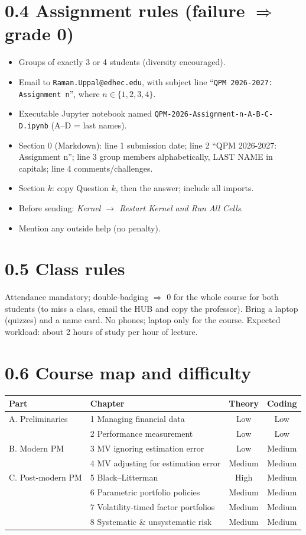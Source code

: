 \documentclass[11pt,a4paper]{report}
\begin{document}
\section*{0.4 Assignment rules (failure $\Rightarrow$ grade 0)}
\begin{itemize}
  \item Groups of exactly 3 or 4 students (diversity encouraged).
  \item Email to \texttt{Raman.Uppal@edhec.edu}, with subject line
        ``\texttt{QPM 2026-2027: Assignment n}'', where $n\in\{1,2,3,4\}$.
  \item Executable Jupyter notebook named
        \texttt{QPM-2026-Assignment-n-A-B-C-D.ipynb} (A--D = last names).
  \item Section 0 (Markdown): line 1 submission date; line 2
        ``QPM 2026-2027: Assignment n''; line 3 group members alphabetically,
        LAST NAME in capitals; line 4 comments/challenges.
  \item Section $k$: copy Question $k$, then the answer; include all imports.
  \item Before sending: \emph{Kernel $\to$ Restart Kernel and Run All Cells}.
  \item Mention any outside help (no penalty).
\end{itemize}

\section*{0.5 Class rules}
Attendance mandatory; double-badging $\Rightarrow$ 0 for the whole course for
both students (to miss a class, email the HUB and copy the professor). Bring a
laptop (quizzes) and a name card. No phones; laptop only for the course.
Expected workload: about 2 hours of study per hour of lecture.

\section*{0.6 Course map and difficulty}
\begin{center}
\begin{tabular}{@{}llcc@{}}
\toprule
Part & Chapter & Theory & Coding \\
\midrule
A. Preliminaries & 1 Managing financial data & Low & Low \\
 & 2 Performance measurement & Low & Low \\
B. Modern PM & 3 MV ignoring estimation error & Low & Medium \\
 & 4 MV adjusting for estimation error & Medium & Medium \\
C. Post-modern PM & 5 Black--Litterman & High & Medium \\
 & 6 Parametric portfolio policies & Medium & Medium \\
 & 7 Volatility-timed factor portfolios & Medium & Medium \\
 & 8 Systematic \& unsystematic risk & Medium & Medium \\
\bottomrule
\end{tabular}
\end{center}
\end{document}
